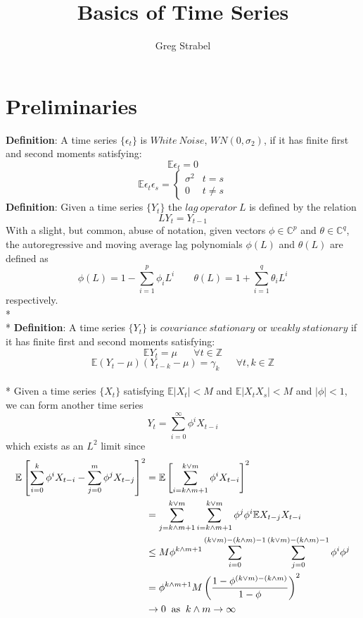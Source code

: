 \documentclass[11pt]{article}
\author{Greg Strabel}
\title{Basics of Time Series}
\begin{document}
\maketitle
\section{Preliminaries}
{\bf Definition}: A time series $\{ \epsilon_t \}$ is $White\ Noise$, $WN \left( 0, \sigma_2 \right)$, if it has finite first and second moments satisfying:
$$\mathbb{E} \epsilon_t = 0$$
\begin{equation}
\mathbb{E} \epsilon_t \epsilon_s = \left\{ \begin{matrix}
\sigma^2 & t=s \\
0 & t\neq s
\end{matrix} \right.
\end{equation}
{\bf Definition}: Given a time series $\{Y_t\}$ the $lag\ operator\ L$ is defined by the relation $$L Y_t = Y_{t-1}$$
With a slight, but common, abuse of notation, given vectors $\phi \in \mathbb{C}^p$ and $\theta \in \mathbb{C}^q$, the autoregressive and moving average lag polynomials $\phi \left( L \right)$ and $\theta \left( L \right)$ are defined as
\begin{equation}
\phi \left( L \right) = 1 - \sum_{i=1}^p \phi_i L^i
\;\;\;\;\;\;\;
\theta \left( L \right) = 1 + \sum_{i=1}^q \theta_i L^i
\end{equation}
respectively.
\\*
\\*
{\bf Definition}: A time series $\{ Y_t \}$ is $covariance\ stationary$ or $weakly\ stationary$ if it has finite first and second moments satisfying:
$$\mathbb{E} Y_t = \mu \;\;\;\;\;\; \forall t \in \mathbb{Z}$$
$$\mathbb{E} \left( Y_t - \mu \right) \left( Y_{t-k} - \mu \right) = \gamma_k \;\;\;\;\;\; \forall t,k \in \mathbb{Z}$$
\\*
Given a time series $\{X_t\}$ satisfying $\mathbb{E} | X_t | < M$ and $\mathbb{E} | X_t X_s | < M$ and $| \phi | < 1$, we can form another time series
$$Y_t = \sum_{i=0}^{\infty} \phi^i X_{t-i}$$
which exists as an $L^2$ limit since
\begin{equation}
\begin{split}
\mathbb{E} \left[ \sum_{i=0}^k \phi^i X_{t-i} - \sum_{j=0}^m \phi^j X_{t-j} \right]^2
& = \mathbb{E} \left[ \sum_{i=k \wedge m + 1}^{k \vee m} \phi^i X_{t-i} \right]^2 \\
& = \sum_{j=k \wedge m + 1}^{k \vee m} \sum_{i=k \wedge m + 1}^{k \vee m} \phi^j \phi^i \mathbb{E} X_{t-j} X_{t-i} \\
& \leq M \phi^{k \wedge m + 1} \sum_{i=0}^{\left( k \vee m \right) - \left( k \wedge m \right) - 1} \sum_{j=0}^{\left( k \vee m \right) - \left( k \wedge m \right) - 1} \phi^i \phi^j \\
& = \phi^{k \wedge m + 1} M \left( \frac{1- \phi^{\left( k \vee m \right) - \left( k \wedge m \right)}}{1 - \phi} \right)^2 \\
& \rightarrow 0 \; \; \textup{as} \; \; k \wedge m \rightarrow \infty
\end{split}
\end{equation}
\end{document}
